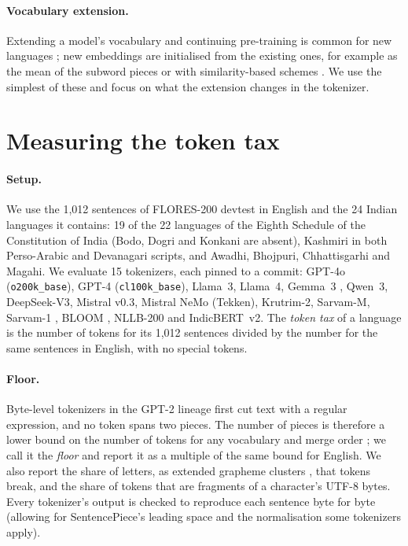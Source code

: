 \documentclass[11pt]{article}
\begin{document}
\paragraph{Vocabulary extension.} Extending a model's vocabulary and continuing pre-training is
common for new languages \citep{cui2023chinesellama}; new embeddings are initialised from the
existing ones, for example as the mean of the subword pieces \citep{hewitt2021initializing} or with
similarity-based schemes \citep{minixhofer2022wechsel,dobler2023focus}. We use the simplest of these
and focus on what the extension changes in the tokenizer.

\section{Measuring the token tax}
\label{sec:measure}

\paragraph{Setup.} We use the 1,012 sentences of FLORES-200 devtest \citep{nllb2022} in English and
the 24 Indian languages it contains: 19 of the 22 languages of the Eighth Schedule of the
Constitution of India (Bodo, Dogri and Konkani are absent), Kashmiri in both Perso-Arabic and
Devanagari scripts, and Awadhi, Bhojpuri, Chhattisgarhi and Magahi. We evaluate 15 tokenizers, each
pinned to a commit: GPT-4o (\texttt{o200k\_base}), GPT-4 (\texttt{cl100k\_base}), Llama~3, Llama~4,
Gemma~3 \citep{gemma2025gemma3}, Qwen~3, DeepSeek-V3, Mistral v0.3, Mistral NeMo (Tekken), Krutrim-2, Sarvam-M, Sarvam-1 \citep{sarvam2024sarvam1},
BLOOM \citep{bigscience2022bloom}, NLLB-200 and IndicBERT~v2. The \emph{token tax} of a language is the number of tokens for its
1,012 sentences divided by the number for the same sentences in English, with no special tokens.

\paragraph{Floor.} Byte-level tokenizers in the GPT-2 lineage \citep{radford2019gpt2} first cut text
with a regular expression, and no token spans two pieces. The number of pieces is therefore a lower
bound on the number of tokens for any vocabulary and merge order \citep{regmi2026vowel}; we call it
the \emph{floor} and report it as a multiple of the same bound for English. We also report the share of letters, as extended grapheme clusters
\citep{unicode29}, that tokens break, and the share of tokens that are fragments of a character's
UTF-8 bytes. Every tokenizer's output is checked to reproduce each sentence byte for byte (allowing
for SentencePiece's leading space and the normalisation some tokenizers apply).
\end{document}

